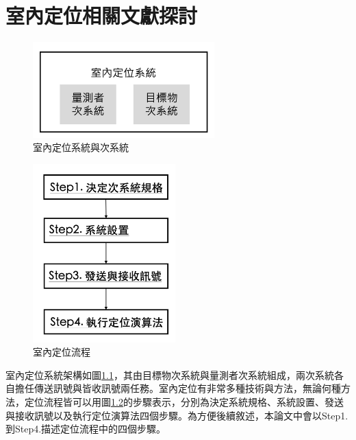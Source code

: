 \chapter{室內定位相關文獻探討}


\begin{figure}[htpb]
    \centering
    \includegraphics[width=7cm]{ch2pic/subsystem.png}
    \caption{室內定位系統與次系統}
    \label{pic:subsystem}
\end{figure}

\begin{figure}[htpb]
    \centering
    \includegraphics[width=5.5cm]{ch2pic/pos_flow.png}
    \caption{室內定位流程}
    \label{pic:pos_flow}
\end{figure}


室內定位系統架構如圖\ref{pic:subsystem}，其由目標物次系統與量測者次系統組成，兩次系統各自擔任傳送訊號與皆收訊號兩任務。室內定位有非常多種技術與方法，無論何種方法，定位流程皆可以用圖\ref{pic:pos_flow}的步驟表示，分別為決定系統規格、系統設置、發送與接收訊號以及執行定位演算法四個步驟。為方便後續敘述，本論文中會以Step1.到Step4.描述定位流程中的四個步驟。

